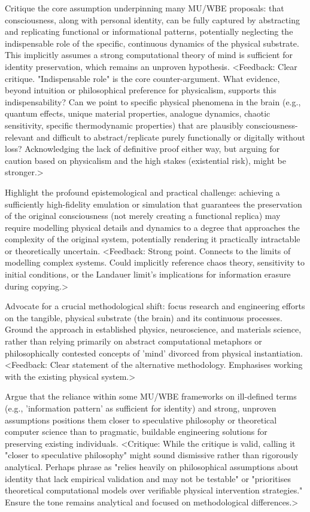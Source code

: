 \documentclass[10pt]{article}
\begin{document}
\begin{sloppypar}
  Critique the core assumption underpinning many MU/WBE proposals: that consciousness, along with personal identity, can be fully captured by abstracting and replicating functional or informational patterns, potentially neglecting the indispensable role of the specific, continuous dynamics of the physical substrate. This implicitly assumes a strong computational theory of mind is sufficient for identity preservation, which remains an unproven hypothesis. <Feedback: Clear critique. "Indispensable role" is the core counter-argument. What evidence, beyond intuition or philosophical preference for physicalism, supports this indispensability? Can we point to specific physical phenomena in the brain (e.g., quantum effects, unique material properties, analogue dynamics, chaotic sensitivity, specific thermodynamic properties) that are plausibly consciousness-relevant and difficult to abstract/replicate purely functionally or digitally without loss? Acknowledging the lack of definitive proof either way, but arguing for caution based on physicalism and the high stakes (existential risk), might be stronger.>

  Highlight the profound epistemological and practical challenge: achieving a sufficiently high-fidelity emulation or simulation that guarantees the preservation of the original consciousness (not merely creating a functional replica) may require modelling physical details and dynamics to a degree that approaches the complexity of the original system, potentially rendering it practically intractable or theoretically uncertain. <Feedback: Strong point. Connects to the limits of modelling complex systems. Could implicitly reference chaos theory, sensitivity to initial conditions, or the Landauer limit's implications for information erasure during copying.>

  Advocate for a crucial methodological shift: focus research and engineering efforts on the tangible, physical substrate (the brain) and its continuous processes. Ground the approach in established physics, neuroscience, and materials science, rather than relying primarily on abstract computational metaphors or philosophically contested concepts of 'mind' divorced from physical instantiation. <Feedback: Clear statement of the alternative methodology. Emphasises working with the existing physical system.>

  Argue that the reliance within some MU/WBE frameworks on ill-defined terms (e.g., 'information pattern' as sufficient for identity) and strong, unproven assumptions positions them closer to speculative philosophy or theoretical computer science than to pragmatic, buildable engineering solutions for preserving existing individuals. <Critique: While the critique is valid, calling it "closer to speculative philosophy" might sound dismissive rather than rigorously analytical. Perhaps phrase as "relies heavily on philosophical assumptions about identity that lack empirical validation and may not be testable" or "prioritises theoretical computational models over verifiable physical intervention strategies." Ensure the tone remains analytical and focused on methodological differences.>


\end{sloppypar}
\end{document}
